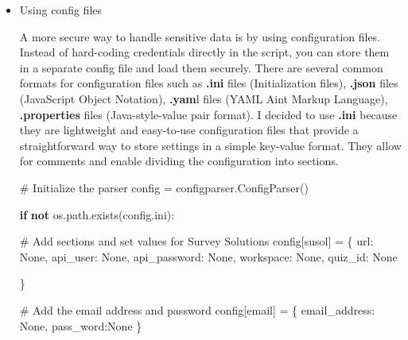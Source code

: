 \documentclass[
  letterpaper,
  DIV=11,
  numbers=noendperiod]{scrreprt}
\newenvironment{Shaded}{\begin{snugshade}}{\end{snugshade}}
\newcommand{\CommentTok}[1]{\textcolor[rgb]{0.37,0.37,0.37}{#1}}
\newcommand{\ControlFlowTok}[1]{\textcolor[rgb]{0.00,0.23,0.31}{\textbf{#1}}}
\newcommand{\KeywordTok}[1]{\textcolor[rgb]{0.00,0.23,0.31}{\textbf{#1}}}
\newcommand{\NormalTok}[1]{\textcolor[rgb]{0.00,0.23,0.31}{#1}}
\newcommand{\OperatorTok}[1]{\textcolor[rgb]{0.37,0.37,0.37}{#1}}
\newcommand{\StringTok}[1]{\textcolor[rgb]{0.13,0.47,0.30}{#1}}
\newcommand{\VariableTok}[1]{\textcolor[rgb]{0.07,0.07,0.07}{#1}}
\begin{document}
\begin{itemize}
\item
  Using config files

  A more secure way to handle sensitive data is by using configuration
  files. Instead of hard-coding credentials directly in the script, you
  can store them in a separate config file and load them securely. There
  are several common formats for configuration files such as
  \textbf{.ini} files (Initialization files), \textbf{.json} files
  (JavaScript Object Notation), \textbf{.yam}l files (YAML Aint Markup
  Language), \textbf{.properties} files (Java-style-value pair format).
  I decided to use \textbf{.ini} because they are lightweight and
  easy-to-use configuration files that provide a straightforward way to
  store settings in a simple key-value format. They allow for comments
  and enable dividing the configuration into sections.

\begin{Shaded}
\begin{Highlighting}[]
\CommentTok{\# Initialize the parser}
\NormalTok{config }\OperatorTok{=}\NormalTok{ configparser.ConfigParser()}

\ControlFlowTok{if} \KeywordTok{not}\NormalTok{ os.path.exists(}\StringTok{\textquotesingle{}config.ini\textquotesingle{}}\NormalTok{):}

   \CommentTok{\# Add sections and set values for Survey Solutions}
\NormalTok{    config[}\StringTok{\textquotesingle{}susol\textquotesingle{}}\NormalTok{] }\OperatorTok{=}\NormalTok{ \{}
        \StringTok{\textquotesingle{}url\textquotesingle{}}\NormalTok{: }\VariableTok{None}\NormalTok{,}
        \StringTok{\textquotesingle{}api\_user\textquotesingle{}}\NormalTok{: }\VariableTok{None}\NormalTok{,}
        \StringTok{\textquotesingle{}api\_password\textquotesingle{}}\NormalTok{: }\VariableTok{None}\NormalTok{,}
        \StringTok{\textquotesingle{}workspace\textquotesingle{}}\NormalTok{: }\VariableTok{None}\NormalTok{,}
        \StringTok{\textquotesingle{}quiz\_id\textquotesingle{}}\NormalTok{: }\VariableTok{None}

\NormalTok{    \}}

  \CommentTok{\# Add the email address and password}
\NormalTok{    config[}\StringTok{\textquotesingle{}email\textquotesingle{}}\NormalTok{] }\OperatorTok{=}\NormalTok{ \{}
        \StringTok{\textquotesingle{}email\_address\textquotesingle{}}\NormalTok{: }\VariableTok{None}\NormalTok{,}
        \StringTok{\textquotesingle{}pass\_word\textquotesingle{}}\NormalTok{:}\VariableTok{None}
\NormalTok{    \}}


\end{Highlighting}
\end{Shaded}
\end{itemize}
\end{document}
